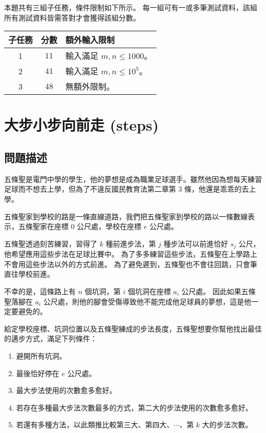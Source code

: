 本題共有三組子任務，條件限制如下所示。
每一組可有一或多筆測試資料，該組所有測試資料皆需答對才會獲得該組分數。

\begin{longtable}[]{@{}ccl@{}}
\toprule
子任務 & 分數 & 額外輸入限制 \\
\midrule
\endhead
1 & \(11\) & 輸入滿足 \(m, n \le 1000\)。 \\
2 & \(41\) & 輸入滿足 \(m, n \le 10^5\)。 \\
3 & \(48\) & 無額外限制。 \\
\bottomrule
\end{longtable}

\section{大步小步向前走 (steps)}

\subsection{問題描述}

五條聖是電門中學的學生，他的夢想是成為職業足球選手。雖然他因為想每天練習足球而不想去上學，但為了不違反國民教育法第二章第
\(3\) 條，他還是乖乖的去上學。

五條聖家到學校的路是一條直線道路，我們把五條聖家到學校的路以一條數線表示，五條聖家在座標
\(0\) 公尺處，學校在座標 \(e\) 公尺處。

五條聖透過刻苦練習，習得了 \(k\) 種前進步法，第 \(j\) 種步法可以前進恰好
\(s_j\) 公尺，他希望應用這些步法在足球比賽中。
為了多多練習這些步法，五條聖在上學路上不會用這些步法以外的方式前進。
為了避免遲到，五條聖也不會往回跳，只會筆直往學校前進。

不幸的是，這條路上有 \(n\) 個坑洞，第 \(i\) 個坑洞在座標 \(a_i\)
公尺處。 因此如果五條聖落腳在 \(a_i\)
公尺處，則他的腳會受傷導致他不能完成他足球員的夢想，這是他一定要避免的。

給定學校座標、坑洞位置以及五條聖練成的步法長度，五條聖想要你幫他找出最佳的邁步方式，滿足下列條件：

\begin{enumerate}
\def\labelenumi{\arabic{enumi}.}
\tightlist
\item
  避開所有坑洞。
\item
  最後恰好停在 \(e\) 公尺處。
\item
  最大步法使用的次數愈多愈好。
\item
  若存在多種最大步法次數最多的方式，第二大的步法使用的次數愈多愈好。
\item
  若還有多種方法，以此類推比較第三大、第四大、\(\cdots\)、第 \(k\)
  大的步法次數。
\end{enumerate}

